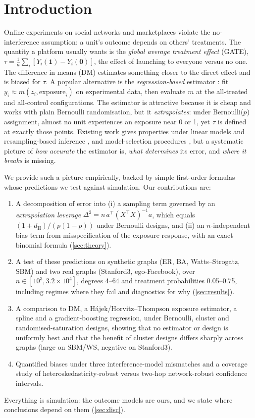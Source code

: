 \documentclass{article}
\theoremstyle{plain}
\theoremstyle{remark}
\newcommand{\dH}{d_{\mathrm H}}
\begin{document}
\section{Introduction}
Online experiments on social networks and marketplaces violate the no-interference assumption: a unit's outcome depends on others' treatments. The quantity a platform usually wants is the \emph{global average treatment effect} (GATE), $\tau=\frac1n\sum_i[Y_i(\mathbf 1)-Y_i(\mathbf 0)]$, the effect of launching to everyone versus no one. The difference in means (DM) estimates something closer to the direct effect and is biased for $\tau$. A popular alternative is the \emph{regression-based} estimator \citep{chin2019,han2023}: fit $y_i\approx m(z_i,\text{exposure}_i)$ on experimental data, then evaluate $m$ at the all-treated and all-control configurations. The estimator is attractive because it is cheap and works with plain Bernoulli randomisation, but it \emph{extrapolates}: under Bernoulli($p$) assignment, almost no unit experiences an exposure near 0 or 1, yet $\tau$ is defined at exactly those points. Existing work gives properties under linear models and resampling-based inference \citep{chin2019}, and model-selection procedures \citep{han2023}, but a systematic picture of \emph{how accurate} the estimator is, \emph{what determines} its error, and \emph{where it breaks} is missing.

We provide such a picture empirically, backed by simple first-order formulas whose predictions we test against simulation. Our contributions are:
\begin{enumerate}
\item A decomposition of error into (i) a sampling term governed by an \emph{extrapolation leverage} $\Delta^2=n\,a^\top(X^\top X)^{-1}a$, which equals $(1+\dH)/(p(1-p))$ under Bernoulli designs, and (ii) an $n$-independent bias term from misspecification of the exposure response, with an exact binomial formula (\cref{sec:theory}).
\item A test of these predictions on synthetic graphs (ER, BA, Watts--Strogatz, SBM) and two real graphs (Stanford3, ego-Facebook), over $n\in[10^3,3.2\times10^4]$, degrees 4--64 and treatment probabilities 0.05--0.75, including regimes where they fail and diagnostics for why (\cref{sec:results}).
\item A comparison to DM, a Hájek/Horvitz--Thompson exposure estimator, a spline and a gradient-boosting regression, under Bernoulli, cluster and randomised-saturation designs, showing that no estimator or design is uniformly best and that the benefit of cluster designs differs sharply across graphs (large on SBM/WS, negative on Stanford3).
\item Quantified biases under three interference-model mismatches and a coverage study of heteroskedasticity-robust versus two-hop network-robust confidence intervals.
\end{enumerate}
Everything is simulation: the outcome models are ours, and we state where conclusions depend on them (\cref{sec:disc}).
\end{document}
